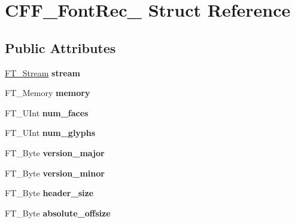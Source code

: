 \hypertarget{struct_c_f_f___font_rec__}{}\section{C\+F\+F\+\_\+\+Font\+Rec\+\_\+ Struct Reference}
\label{struct_c_f_f___font_rec__}
\subsection*{Public Attributes}
\begin{DoxyCompactItemize}
\item 
\mbox{\label{struct_c_f_f___font_rec___a756c5b9e707ff6ff95dd5a2a7a225217}} 
\hyperlink{struct_f_t___stream_rec__}{F\+T\+\_\+\+Stream} {\bfseries stream}
\item 
\mbox{\label{struct_c_f_f___font_rec___ad98d7a458521e6be541430030cb2a6f9}} 
F\+T\+\_\+\+Memory {\bfseries memory}
\item 
\mbox{\label{struct_c_f_f___font_rec___a11972f1fc14dabe555c335d4faa3307e}} 
F\+T\+\_\+\+U\+Int {\bfseries num\+\_\+faces}
\item 
\mbox{\label{struct_c_f_f___font_rec___af938965b67a100d7e1a487059321c3d6}} 
F\+T\+\_\+\+U\+Int {\bfseries num\+\_\+glyphs}
\item 
\mbox{\label{struct_c_f_f___font_rec___a3f3d5b834c2a7cd26c6ce9ea7357cfcf}} 
F\+T\+\_\+\+Byte {\bfseries version\+\_\+major}
\item 
\mbox{\label{struct_c_f_f___font_rec___ac34ee540c6e483c7ca3c3ec8dd38bae6}} 
F\+T\+\_\+\+Byte {\bfseries version\+\_\+minor}
\item 
\mbox{\label{struct_c_f_f___font_rec___a4981839c9fce0d1e9a8fd13523927b3e}} 
F\+T\+\_\+\+Byte {\bfseries header\+\_\+size}
\item 
\mbox{\label{struct_c_f_f___font_rec___a60da94381f87a04f7d774b39d6f117a3}} 
F\+T\+\_\+\+Byte {\bfseries absolute\+\_\+offsize}
\item 

\end{DoxyCompactItemize}
